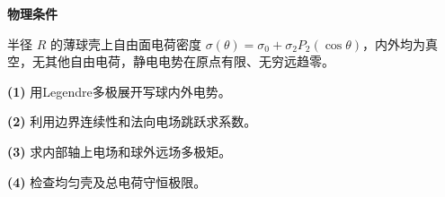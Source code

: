 \textbf{物理条件}\par 半径 \(R\) 的薄球壳上自由面电荷密度 \(\sigma(\theta)=\sigma_0+\sigma_2P_2(\cos\theta)\)，内外均为真空，无其他自由电荷，静电电势在原点有限、无穷远趋零。
\par\noindent\textbf{(1)} 用Legendre多极展开写球内外电势。
\par\noindent\textbf{(2)} 利用边界连续性和法向电场跳跃求系数。
\par\noindent\textbf{(3)} 求内部轴上电场和球外远场多极矩。
\par\noindent\textbf{(4)} 检查均匀壳及总电荷守恒极限。
